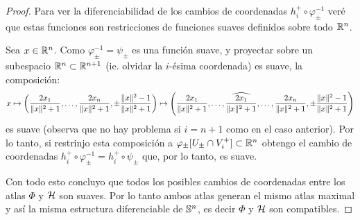 \begin{proof}
  Para ver la diferenciabilidad de los cambios de coordenadas $h_i^+\circ\varphi_{\pm}^{-1}$
  ver\'e que estas funciones son restricciones de funciones suaves definidos sobre todo $\mathbb{R}^n$.

  Sea $x\in \mathbb{R}^n$. Como $\varphi_{\pm}^{-1}=\psi_{\pm}$ es una funci\'on suave, y proyectar sobre
  un subespacio $\mathbb{R}^n\subset \mathbb{R}^{n+1}$ (ie. olvidar la $i$-\'esima coordenada) es suave, la
  composici\'on:
  \[
    x \mapsto
    \paren{\frac{2x_1}{\|x\|^2+1},\ldots,\frac{2x_n}{\|x\|^2+1},\pm\frac{\|x\|^2-1}{\|x\|^2+1}}\mapsto
    \paren{\frac{2x_1}{\|x\|^2+1},\ldots,\widehat{\frac{2x_1}{\|x\|^2+1}},\ldots,%
      \frac{2x_n}{\|x\|^2+1},\pm\frac{\|x\|^2-1}{\|x\|^2+1}}
  \]
  es suave (observa que no hay problema si $i=n+1$ como en el caso anterior). Por lo tanto,
  si restrinjo esta composici\'on a $\varphi_{\pm}[U_{\pm}\cap V_i^+]\subset\mathbb{R}^n$ obtengo el cambio
  de coordenadas $h_i^+\circ\varphi_{\pm}^{-1}=h_i^+\circ\psi_{\pm}$ que, por lo tanto, es suave.

  Con todo esto concluyo que todos los posibles cambios de coordenadas entre los atlas $\Phi$
  y $\mathcal{H}$ son suaves. Por lo tanto ambos atlas generan el mismo atlas maximal y as\'i la misma
  estructura diferenciable de $\mathbb{S}^n$, es decir $\Phi$ y $\mathcal{H}$ son compatibles.  
\end{proof}%

